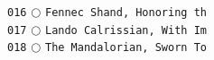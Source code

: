 \documentclass[a4paper,landscape]{article}
\begin{document}
\begin{multicols*}{5}
\texttt{016} \(\bigcirc\)  \texttt{Fennec Shand, Honoring th} \vspace{-0.3mm}\\ 
\texttt{017} \(\bigcirc\)  \texttt{Lando Calrissian, With Im} \vspace{-0.3mm}\\ 
\texttt{018} \(\bigcirc\)  \texttt{The Mandalorian, Sworn To} \vspace{-0.3mm}\\ 

\end{multicols*}
\end{document}
